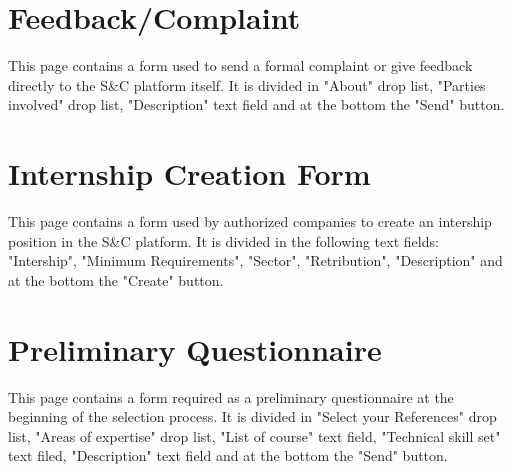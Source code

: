\section{Feedback/Complaint}
This page contains a form used to send a formal complaint or give feedback directly to the S\&C platform itself.
It is divided in "About" drop list, "Parties involved" drop list, "Description" text field and at the bottom the "Send" button.

\section{Internship Creation Form}
This page contains a form used by authorized companies to create an intership position in the S\&C platform.
It is divided in the following text fields: "Intership", "Minimum Requirements", "Sector", "Retribution", "Description" and
 at the bottom the "Create" button. 

\section{Preliminary Questionnaire}
This page contains a form required as a preliminary questionnaire at the beginning of the selection process.
It is divided in "Select your References" drop list, "Areas of expertise" drop list, "List of course" text field, 
"Technical skill set" text filed, "Description" text field and at the bottom the "Send" button.





